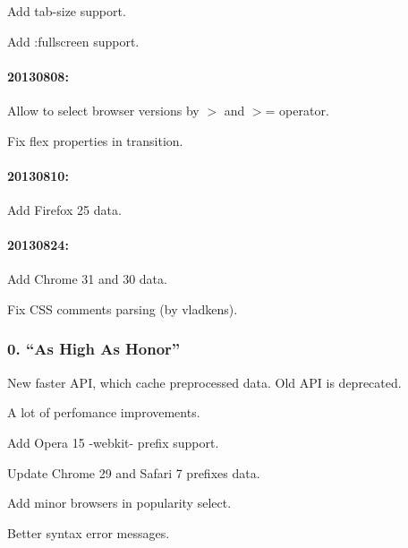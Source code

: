 \begin{DoxyItemize}
\item Add tab-\/size support.
\item Add \+:fullscreen support.
\end{DoxyItemize}

\paragraph*{20130808\+:}


\begin{DoxyItemize}
\item Allow to select browser versions by $>$ and $>$= operator.
\item Fix flex properties in transition.
\end{DoxyItemize}

\paragraph*{20130810\+:}


\begin{DoxyItemize}
\item Add Firefox 25 data.
\end{DoxyItemize}

\paragraph*{20130824\+:}


\begin{DoxyItemize}
\item Add Chrome 31 and 30 data.
\item Fix C\+SS comments parsing (by vladkens).
\end{DoxyItemize}

\subsubsection*{0. “\+As High As Honor”}


\begin{DoxyItemize}
\item New faster A\+PI, which cache preprocessed data. Old A\+PI is deprecated.
\item A lot of perfomance improvements.
\item Add Opera 15 -\/webkit-\/ prefix support.
\item Update Chrome 29 and Safari 7 prefixes data.
\item Add minor browsers in popularity select.
\item Better syntax error messages.
\end{DoxyItemize}

